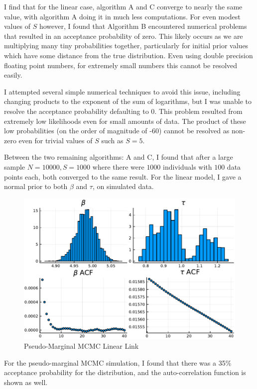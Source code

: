\documentclass[12pt]{paper}
\begin{document}
I find that for the linear case, algorithm A and C converge to nearly
the same value, with algorithm A doing it in much less
computations. For even modest values of $S$ however, I found that
Algorithm B encountered numerical problems that resulted in an
acceptance probability of zero. This likely occurs as we are
multiplying many tiny probabilities together, particularly for
initial prior values which have some distance from the true
distribution. Even using double precision floating point numbers, for
extremely small numbers this cannot be resolved easily.

I attempted several simple numerical techniques to avoid this issue,
including changing products to the exponent of the sum of logarithms,
but I was unable to resolve the acceptance probability defaulting to
0. This problem resulted from extremely low likelihoods even for small
amounts of data. The product of these low probabilities (on the order
of magnitude of -60) cannot be resolved as non-zero even for trivial
values of $S$ such as $S = 5$.

Between the two remaining algorithms: A and C, I found that after a
large sample $N = 10000, S = 1000$ where there were $1000$ individuals
with $100$ data points each, both converged to the same result. For
the linear model, I gave a normal prior to both $\beta$ and $\tau$, on
simulated data. 

\begin{figure}[h!]
  \includegraphics[width=.9\linewidth]{./Linear.pdf}
  \caption{Pseudo-Marginal MCMC Linear Link}
\end{figure}

For the pseudo-marginal MCMC simulation, I found that there was a 35\%
acceptance probability for the distribution, and the auto-correlation
function is shown as well.
\end{document}
